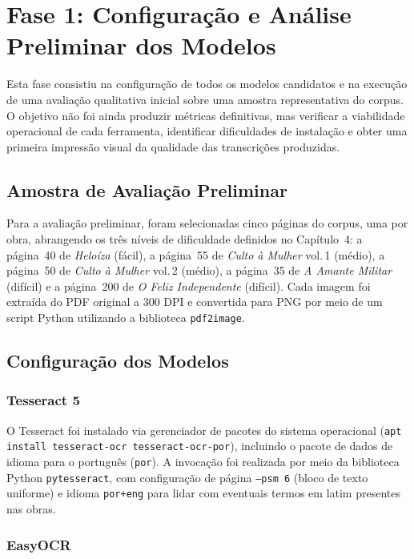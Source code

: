 \documentclass[
  12pt,
  oneside,
  a4paper,
  chapter=TITLE,
  section=TITLE,
  english,
  brazil
]{abntex2}
\begin{document}
\clearpage

\section{Fase 1: Configuração e Análise Preliminar dos Modelos}
\label{sec:fase1}

Esta fase consistiu na configuração de todos os modelos candidatos e na execução de
uma avaliação qualitativa inicial sobre uma amostra representativa do corpus. O
objetivo não foi ainda produzir métricas definitivas, mas verificar a viabilidade
operacional de cada ferramenta, identificar dificuldades de instalação e obter uma
primeira impressão visual da qualidade das transcrições produzidas.

\subsection{Amostra de Avaliação Preliminar}

Para a avaliação preliminar, foram selecionadas cinco páginas do corpus, uma por obra,
abrangendo os três níveis de dificuldade definidos no Capítulo~4: a página~40 de
\textit{Heloíza} (fácil), a página~55 de \textit{Culto à Mulher} vol.\,1 (médio), a
página~50 de \textit{Culto à Mulher} vol.\,2 (médio), a página~35 de \textit{A Amante
Militar} (difícil) e a página~200 de \textit{O Feliz Independente} (difícil). Cada
imagem foi extraída do PDF original a 300 DPI e convertida para PNG por meio de um
script Python utilizando a biblioteca \texttt{pdf2image}.

\subsection{Configuração dos Modelos}

\subsubsection{Tesseract 5}

O Tesseract foi instalado via gerenciador de pacotes do sistema operacional
(\texttt{apt install tesseract-ocr tesseract-ocr-por}), incluindo o pacote de dados
de idioma para o português (\texttt{por}). A invocação foi realizada por meio da
biblioteca Python \texttt{pytesseract}, com configuração de página
\texttt{--psm~6} (bloco de texto uniforme) e idioma \texttt{por+eng} para lidar com
eventuais termos em latim presentes nas obras.

\subsubsection{EasyOCR}
\end{document}
